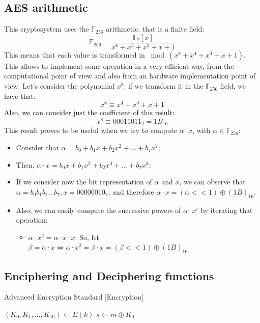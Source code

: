 \subsection{AES arithmetic}
This cryptosystem uses the $\mathbb{F}_{256}$ arithmetic, that is a finite field: \[\mathbb{F}_{256} = \frac{\mathbb{F}_{2}[x]}{x^{8} + x^{4} + x^{3} + x + 1}\]
This means that each value is transformed in $\bmod (x^{8} + x^{4} + x^{3} + x + 1)$. This allows to implement some operation in a very efficient way, from the computational point of view and also from an hardware implementation point of view.\newline
Let's consider the polynomial $x^{8}$: if we transform it in the $\mathbb{F}_{256}$ field, we have that:
\[x^{8} \equiv x^{4} + x^{3} + x + 1\]
Also, we can consider just the coefficient of this result:
\[x^{8} \equiv 00011011_{2} = 1B_{16}\]
This result proves to be useful when we try to compute $\alpha \cdot x$, with $\alpha \in \mathbb{F}_{256}$:
\begin{itemize}
    \item Consider that $\alpha = b_{0} + b_{1} x + b_{2} x^{2} + \dots + b_{7} x^{7}$;
    \item Then, $\alpha \cdot x = b_{0} x + b_{1} x^{2} + b_{2} x^{3} + \dots + b_{7} x^{8}$;
    \item If we consider now the bit representation of $\alpha$ and $x$, we can observe that $\alpha = b_{0}b_{1}b_{2}\dots b_{7}, x = 00000010_{2}$, and therefore $\alpha \cdot x = (\alpha << 1) \oplus (1B)_{16}$.
    \item Also, we can easily compute the successive powers of $\alpha \cdot x^{i}$ by iterating that operation:
    \begin{itemize}
        \item $\alpha \cdot x^{2} = \alpha \cdot x \cdot x$. So, let $\beta = \alpha \cdot x \iff \alpha \cdot x^{2} = \beta \cdot x = (\beta << 1) \oplus (1B)_{16}$
    \end{itemize}
\end{itemize}

\subsection{Enciphering and Deciphering functions}
\begin{algorithm}
\caption{Advanced Encryption Standard [Encryption]}\label{alg:AES_encrypt}
$(K_{0}, K_{1}, \dots, K_{10}) \gets E(k)$\;
$s \gets m \oplus K_{0}$\;
\end{algorithm}

